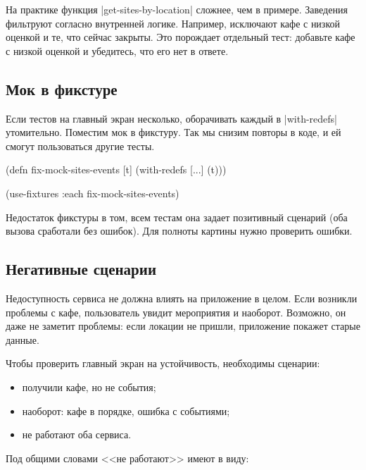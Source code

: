 На практике функция \spverb|get-sites-by-location| сложнее, чем в
примере. Заведения фильтруют согласно внутренней логике. Например, исключают
кафе с низкой оценкой и те, что сейчас закрыты. Это порождает отдельный тест:
добавьте кафе с низкой оценкой и убедитесь, что его нет в ответе.

\subsection{Мок в фикстуре}

Если тестов на главный экран несколько, оборачивать каждый в
\spverb|with-redefs| утомительно. Поместим мок в фикстуру. Так мы снизим повторы
в коде, и ей смогут пользоваться другие тесты.

\begin{english}
  \begin{clojure}
(defn fix-mock-sites-events [t]
  (with-redefs [...]
    (t)))

(use-fixtures :each fix-mock-sites-events)
  \end{clojure}
\end{english}

Недостаток фикстуры в том, всем тестам она задает позитивный сценарий (оба
вызова сработали без ошибок). Для полноты картины нужно проверить ошибки.

\subsection{Негативные сценарии}

Недоступность сервиса не должна влиять на приложение в целом. Если возникли
проблемы с кафе, пользователь увидит мероприятия и наоборот. Возможно, он даже
не заметит проблемы: если локации не пришли, приложение покажет старые данные.

Чтобы проверить главный экран на устойчивость, необходимы сценарии:

\begin{itemize}

\item
  получили кафе, но не события;

\item
  наоборот: кафе в порядке, ошибка с событиями;

\item
  не работают оба сервиса.

\end{itemize}

Под общими словами <<не работают>> имеют в виду:

